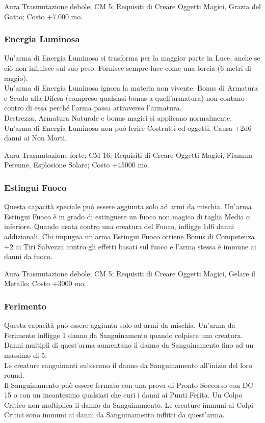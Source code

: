 \begin{multicols}{2}
Aura Trasmutazione debole; CM 5; Requisiti di Creare Oggetti Magici, Grazia del Gatto; Costo +7.000 mo.

\subsubsection{Energia Luminosa}

Un'arma di Energia Luminosa si trasforma per la maggior parte in Luce, anche se ciò non influisce sul suo peso. Fornisce sempre luce come una torcia (6 metri di raggio).\\
Un'arma di Energia Luminosa ignora la materia non vivente. Bonus di Armatura e Scudo alla Difesa (compreso qualsiasi bonus a quell'armatura) non contano contro di essa perché l'arma passa attraverso l'armatura.\\
Destrezza, Armatura Naturale e bonus magici si applicano normalmente.\\
Un'arma di Energia Luminosa non può ferire Costrutti ed oggetti. Causa +2d6 danni ai Non Morti.

Aura Trasmutazione forte; CM 16; Requisiti di Creare Oggetti Magici, Fiamma Perenne, Esplosione Solare; Costo +45000 mo.

\subsubsection{Estingui Fuoco}

Questa capacità speciale può essere aggiunta solo ad armi da mischia. Un'arma Estingui Fuoco è in grado di estinguere un fuoco non magico di taglia Media o inferiore. Quando usata contro una creatura del Fuoco, infligge 1d6 danni addizionali. Chi impugna un'arma Estingui Fuoco ottiene Bonus di Competenza +2 ai Tiri Salvezza contro gli effetti basati sul fuoco e l'arma stessa è immune ai danni da fuoco.

Aura Trasmutazione debole; CM 5; Requisiti di Creare Oggetti Magici, Gelare il Metallo; Costo +3000 mo.

\subsubsection{Ferimento}

Questa capacità può essere aggiunta solo ad armi da mischia. Un'arma da Ferimento infligge 1 danno da Sanguinamento quando colpisce una creatura. Danni multipli di quest'arma aumentano il danno da Sanguinamento fino ad un massimo di 5.\\
Le creature sanguinanti subiscono il danno da Sanguinamento all'inizio del loro round.\\
Il Sanguinamento può essere fermato con una prova di Pronto Soccorso con DC 15 o con un incantesimo qualsiasi che curi i danni ai Punti Ferita. Un Colpo Critico non moltiplica il danno da Sanguinamento. Le creature immuni ai Colpi Critici sono immuni ai danni da Sanguinamento inflitti da quest'arma.


\end{multicols}

